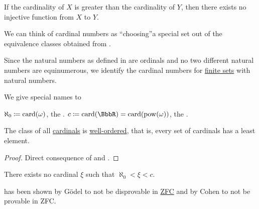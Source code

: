 \begin{corollary}\label{def:pigeonhole_principle}
  If the cardinality of \( X \) is greater than the cardinality of \( Y \), then there exists no injective function from \( X \) to \( Y \).
\end{corollary}

\begin{remark}\label{rem:cardinals}
  We can think of cardinal numbers as \enquote{choosing}\AOC a special set out of the equivalence classes obtained from .

  Since the natural numbers as defined in  are ordinals and no two different natural numbers are equinumerous, we identify the cardinal numbers for \hyperref[def:finite_set]{finite sets} with natural numbers.

  We give special names to
  \begin{thmenum}
     \( \aleph_0 \coloneqq \operatorname{card}(\omega) \), the .
     \( c \coloneqq \card(\BbbR) = \card(\pow(\omega)) \), the .
  \end{thmenum}
\end{remark}

\begin{proposition}\label{thm:cardinals_well_ordered}
  The class of all \hyperref[def:cardinal]{cardinals} is \hyperref[def:well_ordered_set]{well-ordered}, that is, every set of cardinals has a least element.
\end{proposition}
\begin{proof}
  Direct consequence of  and .
\end{proof}

\begin{conjecture}\label{hyp:continuum_conjecture}\mcite\cite[165]{Enderton1977Sets}
  There exists no cardinal \( \xi \) such that \( \aleph_0 < \xi < c \).
\end{conjecture}

\begin{remark}\label{rem:continuum_conjecture}\mcite\cite[165]{Enderton1977Sets}
   has been shown by G\"odel to not be disprovable in \hyperref[def:set_zfc]{ZFC} and by Cohen to not be provable in ZFC.
\end{remark}

